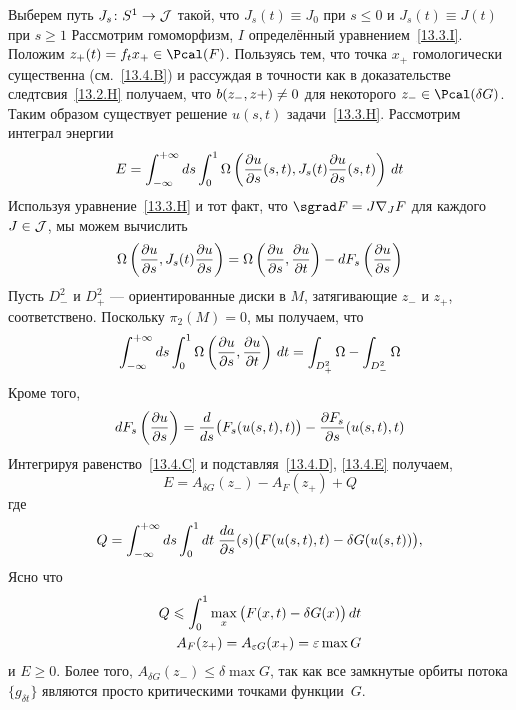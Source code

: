 Выберем путь $J_{s}\colon S^{1}\to\mathcal{J}$ такой, что $J_{s}(t)\equiv J_{0}$
при $s\le0$ и $J_{s}(t)\equiv J(t)$ при $s\ge1$
Рассмотрим гомоморфизм, $I$ определённый уравнением~\ref{13.3.I}.
Положим $z_{+}(t)=f_{t}x_{+}\in\Pcal(F)$.
Пользуясь тем, что точка $x_{+}$ гомологически существенна
(см.~\ref{13.4.B}) и рассуждая в точности как в доказательстве
следтсвия~\ref{13.2.H} получаем, что $b(z_{-}, z+)\z\neq 0$ для
некоторого $z_{-}\in\Pcal(\delta G)$.
Таким образом существует решение $u(s, t)$ задачи~\ref{13.3.H}.
Рассмотрим интеграл энергии
\[
E=
\int_{-\infty}^{+\infty}d s
\int_{0}^{1}
\Omega\left(\frac{\partial u}{\partial s}(s,t),
J_{s}(t)\frac{\partial u}{\partial s}(s,t)\right)
\,d t
\]
Используя уравнение~\ref{13.3.H} и тот факт, что
$\sgrad F=J\nabla_{J}F$ для каждого $J\in\mathcal{J}$, мы можем вычислить
\begin{equation}\label{13.4.C}
  \Omega\left(\frac{\partial u}{\partial s},
  J_{s}(t)\frac{\partial u}{\partial s}\right)
  =
  \Omega\left(\frac{\partial u}{\partial s},
         \frac{\partial u}{\partial t}\right)
  -
  d F_{s}\left(\frac{\partial u}{\partial s}\right)
\end{equation}
Пусть $D^2_{-}$ и $D^2_{+}$ — ориентированные диски в $M$,
затягивающие $z_{-}$ и
$z_{+}$, соответствено.  Поскольку $π_{2}(M)=0$, мы получаем, что
\begin{equation}\label{13.4.D}
  \int_{-\infty}^{+\infty}d s
  \int_{0}^{1}
  \Omega\left(\frac{\partial u}{\partial s},
  \frac{\partial u}{\partial t}\right)
  \,d t
  =
  \int_{D^2_{+}}\Omega-\int_{D^2_{-}}\Omega
\end{equation}
Кроме того,
\begin{equation}\label{13.4.E}
  d F_{s}\left(\frac{\partial u}{\partial s}\right)
  =
  \frac{d}{d s}\big(F_{s}(u(s,t),t)\big) -
  \frac{\partial F_{s}}{\partial s}(u(s,t),t)  
\end{equation}
Интегрируя равенство~\ref{13.4.C} и подставляя~\ref{13.4.D}, \ref{13.4.E}
получаем,
\[
E=A_{\delta G}(z_{-})-A_{F}(z_{+})+Q
\]
где
\[
Q=\int_{-\infty}^{+\infty}d s
  \int_{0}^{1}d t\;
  \frac{d a}{\partial s}(s)\big(F(u(s,t),t)-\delta G(u(s,t))\big),
\]
Ясно что
\begin{align*}
  Q\leqslant
  \int_{0}^{1} \max_{x}\big(F(x,t)-\delta G(x)\big)\,d t\\
  A_{F}(z_{+})=A_{\varepsilon G}(x_{+})=\varepsilon\max G
\end{align*}
и $E\ge0$.
Более того, $A_{\delta G}(z_{-})\le \delta\max G$, так как все
замкнутые орбиты потока $\{g_{\delta t}\}$ являются просто
критическими точками функции~$G$.

